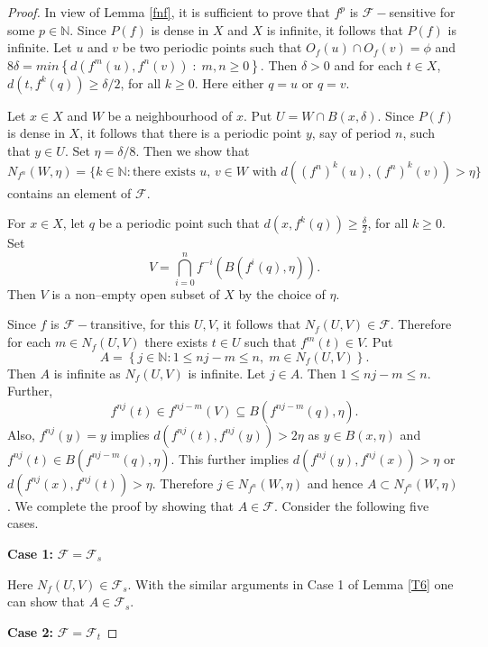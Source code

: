 \documentclass{amsart}[12pt, papera4]
\theoremstyle{definition}
\theoremstyle{remark}
\numberwithin{equation}{section}
\def\N{{\mathbb N}}
\def\F{{\mathscr{F}}}
\def\FS{{\mathscr F_s}}
\begin{document}
\begin{proof}
	In view of Lemma \ref{fnf}, it is sufficient to prove that $f^p$ is $\F-$sensitive for some $p \in \N$. Since $P(f)$ is dense in $X$ and $X$ is infinite, it follows that $P(f)$ is infinite. Let $u$ and $v$ be two periodic points such that $O_f(u)\cap O_f(v)=\phi$ and $8\delta =min\left\{d\left(f^m(u), f^n(v)\right) \; : \; m, n \geq 0 \right\}$. Then $\delta > 0$ and for each $t\in X$, $d\left(t, f^k(q)\right)\geq\delta/2$, for all $k\geq 0$. Here either $q=u$ or $q=v$.
	
	\medskip
	\noindent	Let $x \in X$ and $W$ be a neighbourhood of $x$. Put $U=W\cap B(x,\delta)$. Since $P(f)$ is dense in $X$, it follows that there is a periodic point $y$, say of period $n$, such that $y \in U$. Set $\eta = \delta/8$. Then we show that $N_{f^n}(W,\eta)=\{k\in \N: \mbox{there exists $u$, $v\in W$ with } d\left((f^n)^k(u),(f^n)^k(v)\right)>\eta\}$ contains an element of $\F$. 
	
	\smallskip
	\noindent For $x\in X$, let $q$ be a periodic point such that $d(x,f^k(q))\geq \frac{\delta}{2}$, for all $k\geq 0$. Set $$V=\bigcap_{i=0}^{n}f^{-i}\left(B(f^i(q),\eta)\right).$$ Then $V$ is a non--empty open subset of $X$ by the choice of $\eta$. 
	
	\medskip
	\noindent Since $f$ is $\mathscr{F}-$transitive, for this $U,V$, it follows that $N_f(U,V)\in \mathscr{F}$. Therefore for each $m\in N_f(U,V)$ there exists $t\in U$ such that $f^m(t)\in V$. Put 
	$$A=\left\{j\in \N:1\leq nj-m\leq n, \; m\in N_f(U,V)\right\}.$$ 
	Then $A$ is infinite as $N_f(U,V)$ is infinite. Let $j\in A$. Then $1\leq nj-m\leq n$. Further,
	$$f^{nj}(t)\in f^{nj-m}(V)\subseteq B(f^{nj-m}(q),\eta).$$
	Also, $f^{nj}(y)=y$ implies $ d(f^{nj}(t),f^{nj}(y))>2\eta $ as $y\in B(x,\eta)$ and $f^{nj}(t)\in B(f^{nj-m}(q),\eta)$. This further implies $d(f^{nj}(y),f^{nj}(x))>\eta$ or $d(f^{nj}(x),f^{nj}(t))>\eta$. Therefore $j\in N_{f^n}(W,\eta)$ and hence $A\subset N_{f^n}(W,\eta)$. We complete the proof by showing that $A\in \F$. Consider the following five cases.
	
	\medskip
	\noindent \textbf{Case 1:} $\F=\FS$
	
	\noindent Here $N_f(U,V)\in \F_s$. With the similar arguments in Case 1 of Lemma \ref{T6} one can show that $A\in \F_s$.  
	
	\medskip
	\noindent \textbf{Case 2:} $\F=\F_t$
	

\end{proof}
\end{document}
